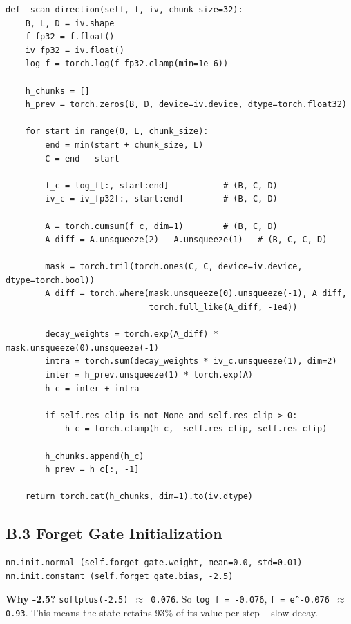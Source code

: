 \begin{lstlisting}
def _scan_direction(self, f, iv, chunk_size=32):
    B, L, D = iv.shape
    f_fp32 = f.float()
    iv_fp32 = iv.float()
    log_f = torch.log(f_fp32.clamp(min=1e-6))
    
    h_chunks = []
    h_prev = torch.zeros(B, D, device=iv.device, dtype=torch.float32)
    
    for start in range(0, L, chunk_size):
        end = min(start + chunk_size, L)
        C = end - start
        
        f_c = log_f[:, start:end]           # (B, C, D)
        iv_c = iv_fp32[:, start:end]        # (B, C, D)
        
        A = torch.cumsum(f_c, dim=1)        # (B, C, D)
        A_diff = A.unsqueeze(2) - A.unsqueeze(1)   # (B, C, C, D)
        
        mask = torch.tril(torch.ones(C, C, device=iv.device, dtype=torch.bool))
        A_diff = torch.where(mask.unsqueeze(0).unsqueeze(-1), A_diff, 
                             torch.full_like(A_diff, -1e4))
        
        decay_weights = torch.exp(A_diff) * mask.unsqueeze(0).unsqueeze(-1)
        intra = torch.sum(decay_weights * iv_c.unsqueeze(1), dim=2)
        inter = h_prev.unsqueeze(1) * torch.exp(A)
        h_c = inter + intra
        
        if self.res_clip is not None and self.res_clip > 0:
            h_c = torch.clamp(h_c, -self.res_clip, self.res_clip)
        
        h_chunks.append(h_c)
        h_prev = h_c[:, -1]
    
    return torch.cat(h_chunks, dim=1).to(iv.dtype)
\end{lstlisting}

\subsection{B.3 Forget Gate Initialization}

\begin{lstlisting}
nn.init.normal_(self.forget_gate.weight, mean=0.0, std=0.01)
nn.init.constant_(self.forget_gate.bias, -2.5)
\end{lstlisting}

\textbf{Why -2.5?} \texttt{softplus(-2.5) $\approx$ 0.076}. So \texttt{log f = -0.076}, 
\texttt{f = e^{-0.076} $\approx$ 0.93}. This means the state retains 93\% of its value 
per step -- slow decay.

